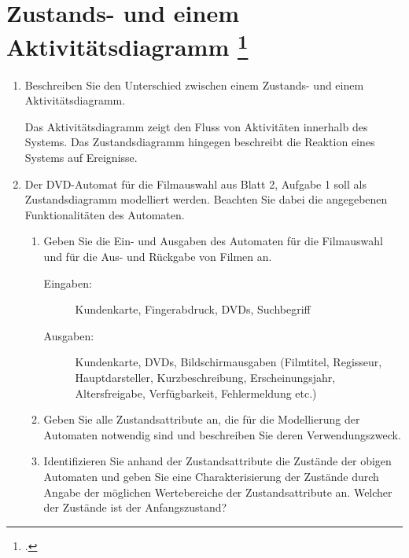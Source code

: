 \documentclass{lehramt-informatik-aufgabe}
\begin{document}

\section{Zustands- und einem Aktivitätsdiagramm
\footcite{sosy:ab:3}}

\begin{enumerate}
\item Beschreiben Sie den Unterschied zwischen einem Zustands- und einem
Aktivitätsdiagramm.

\begin{liAntwort}
Das Aktivitätsdiagramm zeigt den Fluss von Aktivitäten innerhalb des
Systems. Das Zustandsdiagramm hingegen beschreibt die Reaktion eines
Systems auf Ereignisse.
\end{liAntwort}

\item Der DVD-Automat für die Filmauswahl aus Blatt 2, Aufgabe 1 soll
als Zustandsdiagramm modelliert werden. Beachten Sie dabei die
angegebenen Funktionalitäten des Automaten.

\begin{enumerate}
\item Geben Sie die Ein- und Ausgaben des Automaten für die Filmauswahl
und für die Aus- und Rückgabe von Filmen an.

\begin{liAntwort}
\begin{description}
\item[Eingaben:]

Kundenkarte, Fingerabdruck, DVDs, Suchbegriff

\item[Ausgaben:]

Kundenkarte, DVDs, Bildschirmausgaben (Filmtitel, Regisseur,
Hauptdarsteller, Kurzbeschreibung, Erscheinungsjahr, Altersfreigabe,
Verfügbarkeit, Fehlermeldung etc.)
\end{description}
\end{liAntwort}

\item Geben Sie alle Zustandsattribute an, die für die Modellierung der
Automaten notwendig sind und beschreiben Sie deren Verwendungszweck.

\item Identifizieren Sie anhand der Zustandsattribute die Zustände der
obigen Automaten und geben Sie eine Charakterisierung der Zustände durch
Angabe der möglichen Wertebereiche der Zustandsattribute an. Welcher der
Zustände ist der Anfangszustand?


\end{enumerate}
\end{enumerate}
\end{document}
